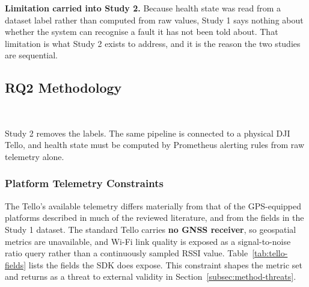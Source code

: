\noindent\textbf{Limitation carried into Study 2.} Because health state was read
from a dataset label rather than computed from raw values, Study 1 says nothing
about whether the system can recognise a fault it has not been told about. That
limitation is what Study 2 exists to address, and it is the reason the two
studies are sequential.

\subsection{RQ2 Methodology}~\label{subsec:method-rq2}

Study 2 removes the labels. The same pipeline is connected to a physical DJI
Tello, and health state must be computed by Prometheus alerting rules from raw
telemetry alone.

\subsubsection{Platform Telemetry Constraints}

The Tello's available telemetry differs materially from that of the GPS-equipped
platforms described in much of the reviewed literature, and from the fields in
the Study 1 dataset. The standard Tello carries \textbf{no GNSS receiver}, so
geospatial metrics are unavailable, and Wi-Fi link quality is exposed as a
signal-to-noise ratio query rather than a continuously sampled RSSI value.
Table~\ref{tab:tello-fields} lists the fields the SDK does expose. This
constraint shapes the metric set and returns as a threat to external validity in
Section~\ref{subsec:method-threats}.

